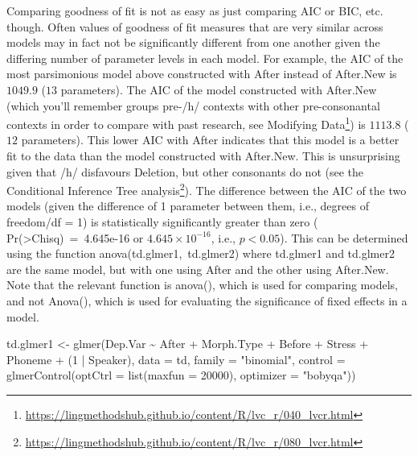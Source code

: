\documentclass[
  10pt,
  letterpaper]{article}
\newenvironment{Shaded}{\begin{snugshade}}{\end{snugshade}}
\newcommand{\AttributeTok}[1]{\textcolor[rgb]{0.40,0.45,0.13}{#1}}
\newcommand{\DecValTok}[1]{\textcolor[rgb]{0.68,0.00,0.00}{#1}}
\newcommand{\FunctionTok}[1]{\textcolor[rgb]{0.28,0.35,0.67}{#1}}
\newcommand{\NormalTok}[1]{\textcolor[rgb]{0.00,0.23,0.31}{#1}}
\newcommand{\OtherTok}[1]{\textcolor[rgb]{0.00,0.23,0.31}{#1}}
\newcommand{\SpecialCharTok}[1]{\textcolor[rgb]{0.37,0.37,0.37}{#1}}
\newcommand{\StringTok}[1]{\textcolor[rgb]{0.13,0.47,0.30}{#1}}
\renewcommand\texttt[1]{{\ttfamily\color{BrickRed}#1}}
\DeclareRobustCommand{\href}[2]{#2\footnote{\url{#1}}}
\begin{document}
\begin{tcolorbox}
Comparing goodness of fit is not as easy as just comparing \texttt{AIC}
or \texttt{BIC}, etc. though. Often values of goodness of fit measures
that are very similar across models may in fact not be significantly
different from one another given the differing number of parameter
levels in each model. For example, the \texttt{AIC} of the most
parsimonious model above constructed with \texttt{After} instead of
\texttt{After.New} is \(1049.9\) (\(13\) parameters). The \texttt{AIC}
of the model constructed with \texttt{After.New} (which you'll remember
groups pre-/h/ contexts with other pre-consonantal contexts in order to
compare with past research, see
\href{https://lingmethodshub.github.io/content/R/lvc_r/040_lvcr.html}{Modifying
Data}) is \(1113.8\) (\(12\) parameters). This lower \texttt{AIC} with
\texttt{After} indicates that this model is a better fit to the data
than the model constructed with \texttt{After.New}. This is unsurprising
given that /h/ disfavours \texttt{Deletion}, but other consonants do not
(see the
\href{https://lingmethodshub.github.io/content/R/lvc_r/080_lvcr.html}{Conditional
Inference Tree analysis}). The difference between the \texttt{AIC} of
the two models (given the difference of 1 parameter between them, i.e.,
degrees of freedom/df = 1) is statistically significantly greater than
zero ( \texttt{Pr(\textgreater{}Chisq)\ =\ 4.645e-16} or
\(4.645\times 10^{-16}\), i.e., \(p<0.05\)). This can be determined
using the function \texttt{anova(td.glmer1,\ td.glmer2)} where
\texttt{td.glmer1} and \texttt{td.glmer2} are the same model, but with
one using \texttt{After} and the other using \texttt{After.New}. Note
that the relevant function is \texttt{anova()}, which is used for
comparing models, and not \texttt{Anova()}, which is used for evaluating
the significance of fixed effects in a model.

\begin{Shaded}
\begin{Highlighting}[]
\NormalTok{td.glmer1 }\OtherTok{\textless{}{-}} \FunctionTok{glmer}\NormalTok{(Dep.Var }\SpecialCharTok{\textasciitilde{}}\NormalTok{ After }\SpecialCharTok{+}\NormalTok{ Morph.Type }\SpecialCharTok{+}\NormalTok{ Before }\SpecialCharTok{+}
\NormalTok{    Stress }\SpecialCharTok{+}\NormalTok{ Phoneme }\SpecialCharTok{+}\NormalTok{ (}\DecValTok{1} \SpecialCharTok{|}\NormalTok{ Speaker), }\AttributeTok{data =}\NormalTok{ td, }\AttributeTok{family =} \StringTok{"binomial"}\NormalTok{,}
    \AttributeTok{control =} \FunctionTok{glmerControl}\NormalTok{(}\AttributeTok{optCtrl =} \FunctionTok{list}\NormalTok{(}\AttributeTok{maxfun =} \DecValTok{20000}\NormalTok{),}
        \AttributeTok{optimizer =} \StringTok{"bobyqa"}\NormalTok{))}


\end{Highlighting}
\end{Shaded}
\end{tcolorbox}
\end{document}
